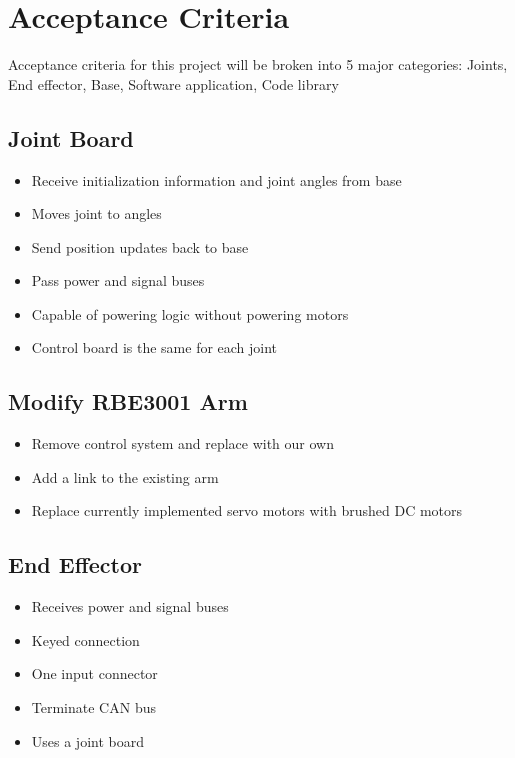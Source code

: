 \section{Acceptance Criteria}
Acceptance criteria for this project will be broken into 5 major categories: Joints, End effector, Base, Software application, Code library

\subsection{Joint Board}
\begin{itemize}
\item Receive initialization information and joint angles from base
\item Moves joint to angles
\item Send position updates back to base
\item Pass power and signal buses
\item Capable of powering logic without powering motors
\item Control board is the same for each joint
\end{itemize}

\subsection{Modify RBE3001 Arm}
\begin{itemize}
\item Remove control system and replace with our own 
\item Add a link to the existing arm
\item Replace currently implemented servo motors with brushed DC motors
\end{itemize}

\subsection{End Effector}
\begin{itemize}
\item Receives power and signal buses
\item Keyed connection
\item One input connector
\item Terminate CAN bus
\item Uses a joint board
\end{itemize}


